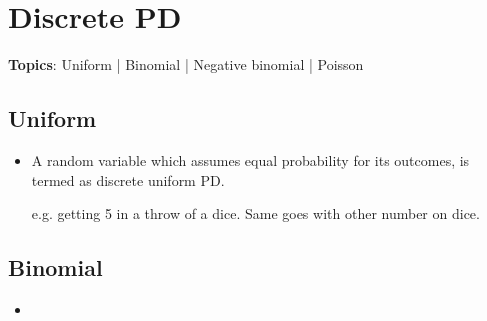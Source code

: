 \documentclass{article}
\begin{document}
\section{Discrete PD}
\textbf{Topics}: Uniform | Binomial | Negative binomial | Poisson

\subsection{Uniform}
\begin{itemize}
	\item A random variable which assumes equal probability for its outcomes, is termed as discrete uniform PD.
	
	e.g. getting 5 in a throw of a dice. Same goes with other number on dice.
\end{itemize}

\subsection{Binomial}
\begin{itemize}
	\item 
\end{itemize}
\end{document}
